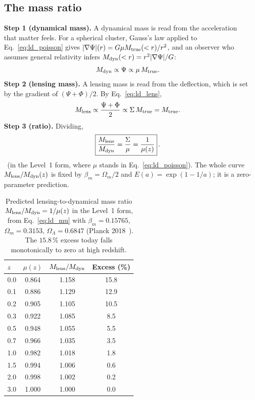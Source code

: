 \subsection{The mass ratio}
\textbf{Step 1 (dynamical mass).} A dynamical mass is read from the acceleration that matter feels. For a spherical cluster, Gauss's law applied to
Eq.~\eqref{eq:ld_poisson} gives $|\nabla\Psi|(r)=G\mu M_{\rm true}(<r)/r^2$, and an observer who assumes general relativity infers
$M_{\rm dyn}(<r)=r^2|\nabla\Psi|/G$:
\begin{equation}
M_{\rm dyn}\propto\Psi\propto\mu\,M_{\rm true}.
\label{eq:ld_mdyn}\end{equation}
\textbf{Step 2 (lensing mass).} A lensing mass is read from the deflection, which is set by the gradient of $(\Psi+\Phi)/2$. By
Eq.~\eqref{eq:ld_lens},
\begin{equation}
M_{\rm lens}\propto\frac{\Psi+\Phi}{2}\propto\Sigma\,M_{\rm true}=M_{\rm true}.
\label{eq:ld_mlens}\end{equation}
\textbf{Step 3 (ratio).} Dividing,
\begin{equation}
\boxed{\frac{M_{\rm lens}}{M_{\rm dyn}}=\frac{\Sigma}{\mu}=\frac{1}{\mu(z)}}\,.
\label{eq:ld_ratio_mu}\end{equation}
\derived\ (in the Level~1 form, where $\mu$ stands in Eq.~\eqref{eq:ld_poisson}). The whole curve $M_{\rm lens}/M_{\rm dyn}(z)$ is fixed by
$\beta_m=\Omega_m/2$ and $E(a)=\exp(1-1/a)$; it is a zero-parameter prediction. \prediction

\begin{table}[htbp]\centering\small
\caption[Predicted lensing-to-dynamical mass ratio]{Predicted lensing-to-dynamical mass ratio $M_{\rm lens}/M_{\rm dyn}=1/\mu(z)$ in the Level~1 form,
from Eq.~\eqref{eq:ld_mu} with $\beta_m=0.15765$, $\Omega_m=0.3153$, $\Omega_\Lambda=0.6847$ (Planck 2018~\cite{Planck2018VI}). The $15.8\,\%$
excess today falls monotonically to zero at high redshift. \calc}\label{tab:ld_ratio}
\begin{tabular}{lccc}\toprule
$z$ & $\mu(z)$ & $M_{\rm lens}/M_{\rm dyn}$ & Excess (\%)\\\midrule
0.0 & 0.864 & 1.158 & 15.8\\
0.1 & 0.886 & 1.129 & 12.9\\
0.2 & 0.905 & 1.105 & 10.5\\
0.3 & 0.922 & 1.085 & 8.5\\
0.5 & 0.948 & 1.055 & 5.5\\
0.7 & 0.966 & 1.035 & 3.5\\
1.0 & 0.982 & 1.018 & 1.8\\
1.5 & 0.994 & 1.006 & 0.6\\
2.0 & 0.998 & 1.002 & 0.2\\
3.0 & 1.000 & 1.000 & 0.0\\\bottomrule
\end{tabular}\end{table}

